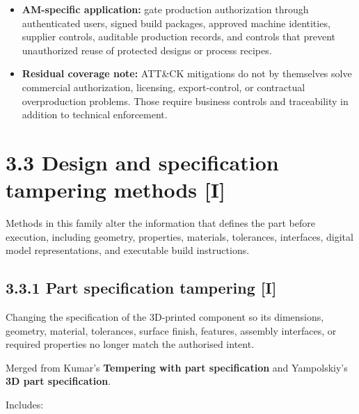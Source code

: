 \documentclass[10pt,a4paper,oneside]{report}
\begin{document}
\begin{itemize}
\item \textbf{AM-specific application:} gate production authorization through authenticated users, signed build packages, approved machine identities, supplier controls, auditable production records, and controls that prevent unauthorized reuse of protected designs or process recipes.
\end{itemize}

\begin{itemize}
\item \textbf{Residual coverage note:} ATT\&CK mitigations do not by themselves solve commercial authorization, licensing, export-control, or contractual overproduction problems. Those require business controls and traceability in addition to technical enforcement.
\end{itemize}


\section{3.3 Design and specification tampering methods [I]}


Methods in this family alter the information that defines the part before execution, including geometry, properties, materials, tolerances, interfaces, digital model representations, and executable build instructions.


\subsection{3.3.1 Part specification tampering [I]}


Changing the specification of the 3D-printed component so its dimensions, geometry, material, tolerances, surface finish, features, assembly interfaces, or required properties no longer match the authorised intent.

Merged from Kumar's \textbf{Tempering with part specification} and Yampolskiy's \textbf{3D part specification}.

Includes:
\end{document}

